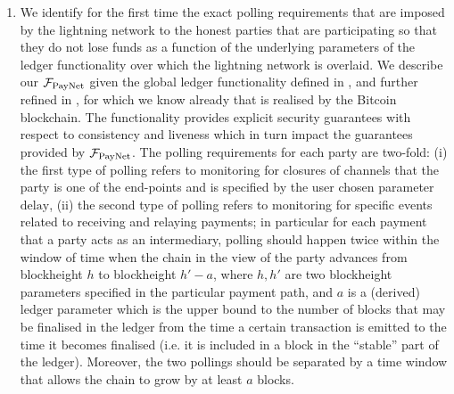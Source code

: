 \begin{enumerate}
\item We identify for the first time the exact polling requirements that are
imposed by the lightning network to the honest parties that are participating so
that they do not lose funds as a function of the underlying parameters of the
ledger functionality over which the lightning network is overlaid. We describe
our $\mathcal{F}_{\mathrm{PayNet}}{}$ given the global ledger functionality defined in \cite{BMTZ17},
and further refined in \cite{genesis}, for which we know already that is
realised by the Bitcoin blockchain. The functionality provides explicit security
guarantees with respect to consistency and liveness which in turn impact the
guarantees provided by $\mathcal{F}_{\mathrm{PayNet}}{}$. The polling requirements for each party are
two-fold: (i) the first type of polling refers to monitoring for closures of
channels that the party is one of the end-points and is specified by the user
chosen parameter $\mathrm{delay}$, (ii) the second type of polling refers to
monitoring for specific events related to receiving and relaying payments; in
particular for each payment that a party acts as an intermediary, polling should
happen twice within the window of time when the chain in the view of the party
advances from blockheight $h$ to blockheight $h'-a$, where $h,h'$ are two
blockheight parameters specified in the particular payment path, and $a$ is a
(derived) ledger parameter which is the upper bound to the number of blocks that
may be finalised in the ledger from the time a certain transaction is emitted to
the time it becomes finalised (i.e. it is included in a block in the ``stable''
part of the ledger). Moreover, the two pollings should be separated by a time
window that allows the chain to grow by at least $a$ blocks.


\end{enumerate}
